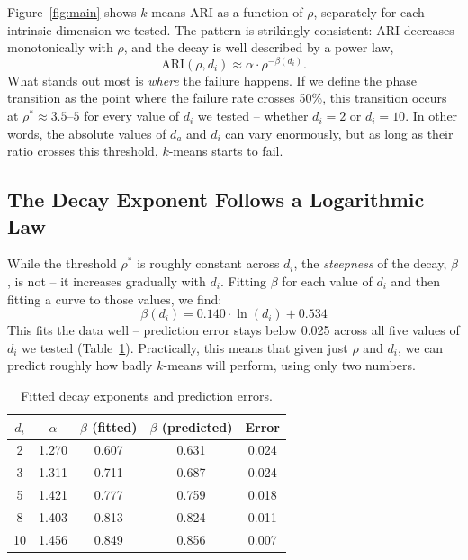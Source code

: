 \documentclass[pdflatex,sn-mathphys-num]{sn-jnl}
\theoremstyle{thmstyleone}
\begin{document}
Figure~\ref{fig:main} shows $k$-means ARI as a function of $\rho$, separately
for each intrinsic dimension we tested. The pattern is strikingly consistent:
ARI decreases monotonically with $\rho$, and the decay is well described by a
power law,
\begin{equation}
    \text{ARI}(\rho, d_i) \approx \alpha \cdot \rho^{-\beta(d_i)}.
\end{equation}
What stands out most is \textit{where} the failure happens. If we define the
phase transition as the point where the failure rate crosses 50\%, this
transition occurs at $\rho^* \approx 3.5$--$5$ for every value of $d_i$ we
tested -- whether $d_i=2$ or $d_i=10$. In other words, the absolute values of
$d_a$ and $d_i$ can vary enormously, but as long as their ratio crosses this
threshold, $k$-means starts to fail.

\subsection{The Decay Exponent Follows a Logarithmic Law}

While the threshold $\rho^*$ is roughly constant across $d_i$, the
\textit{steepness} of the decay, $\beta$, is not -- it increases gradually with
$d_i$. Fitting $\beta$ for each value of $d_i$ and then fitting a curve to
those values, we find:
\begin{equation}
    \beta(d_i) = 0.140 \cdot \ln(d_i) + 0.534
\end{equation}
This fits the data well -- prediction error stays below 0.025 across all five
values of $d_i$ we tested (Table~\ref{tab:beta}). Practically, this means that
given just $\rho$ and $d_i$, we can predict roughly how badly $k$-means will
perform, using only two numbers.

\begin{table}[h]
\centering
\caption{Fitted decay exponents and prediction errors.}
\label{tab:beta}
\begin{tabular}{ccccc}
\toprule
$d_i$ & $\alpha$ & $\beta$ (fitted) & $\beta$ (predicted) & Error \\
\midrule
2  & 1.270 & 0.607 & 0.631 & 0.024 \\
3  & 1.311 & 0.711 & 0.687 & 0.024 \\
5  & 1.421 & 0.777 & 0.759 & 0.018 \\
8  & 1.403 & 0.813 & 0.824 & 0.011 \\
10 & 1.456 & 0.849 & 0.856 & 0.007 \\
\bottomrule
\end{tabular}
\end{table}
\end{document}
